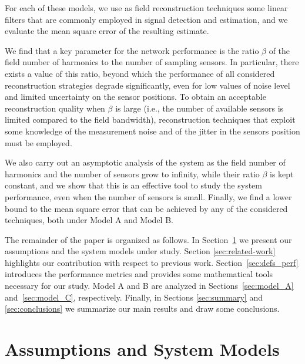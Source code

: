 \documentclass[final, a4paper]{IEEEtran}
\begin{document}
For each of these models, we use as field
reconstruction techniques some linear filters that are commonly
employed in signal detection and estimation, and we evaluate the
mean square error of the resulting estimate.

We find that a key parameter for the network performance is the
ratio $\beta$ of  the field number of harmonics to the number of sampling
sensors. In particular, there exists a value of this ratio,
beyond which the performance of all considered reconstruction
strategies degrade significantly, even for low values of noise level
and limited uncertainty on the sensor positions. To obtain an
acceptable reconstruction quality when $\beta$ is large (i.e., the
number of available sensors is limited compared to the field
bandwidth), reconstruction techniques that exploit some knowledge of
the measurement noise and of the jitter in the sensors position must be employed.

We also carry out an asymptotic analysis of the system as the field
number of harmonics and the number of sensors grow to infinity, while their
ratio $\beta$ is kept constant, and we show that this is an
effective tool to study the system performance, even when the number
of sensors is small. Finally, we find a lower bound to the mean
square error that can be achieved by any of the considered
techniques, both under Model A and Model B.

The remainder of the paper is organized as follows.
In Section~\ref{sec:system_model} we present our assumptions and
the system models under study. Section \ref{sec:related-work}
highlights our contribution with respect to previous work.
Section~\ref{sec:defs_perf} introduces the performance metrics and
provides some mathematical tools necessary for our study. Model A
and B are analyzed in Sections~\ref{sec:model_A}
and~\ref{sec:model_C}, respectively.
Finally, in Sections \ref{sec:summary} and \ref{sec:conclusions} we summarize our main results and
draw some conclusions.


\section{Assumptions and System Models}
\label{sec:system_model}
\end{document}
